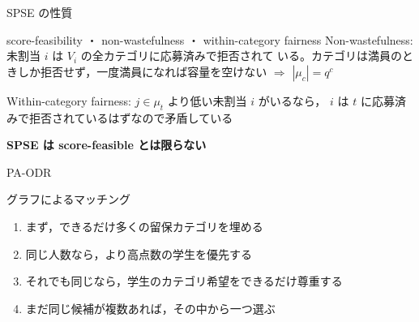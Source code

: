 \documentclass[aspectratio=43,11pt]{beamer}
\newcommand{\muc}[1]{\mu_{#1}}
\begin{document}
\begin{frame}{SPSE の性質}
  \begin{block}{score-feasibility ・ non-wastefulness ・ within-category fairness}
    Non-wastefulness: 未割当 $i$ は $V_i$ の全カテゴリに応募済みで拒否されて
    いる。カテゴリは満員のときしか拒否せず，一度満員になれば容量を空けない
    $\Rightarrow$ $|\muc{c}| = q^c$

    \vspace{0.8em}
    Within-category fairness: $j \in \muc{t}$ より低い未割当 $i$ がいるなら，
    $i$ は $t$ に応募済みで拒否されているはずなので矛盾している

    \vspace{0.8em}
    \textbf{SPSE は score-feasible とは限らない}
  \end{block}
\end{frame}

\begin{frame}{PA-ODR}
  \begin{block}{グラフによるマッチング}
    \begin{enumerate}
      \item まず，できるだけ多くの留保カテゴリを埋める
      \item 同じ人数なら，より高点数の学生を優先する
      \item それでも同じなら，学生のカテゴリ希望をできるだけ尊重する
      \item まだ同じ候補が複数あれば，その中から一つ選ぶ
    \end{enumerate}
  \end{block}
\end{frame}
\end{document}
